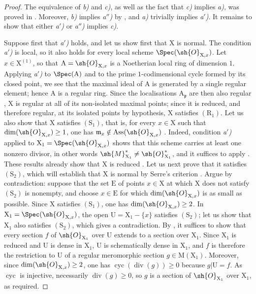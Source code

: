 \begin{proof}
The equivalence of \emph{b)} and \emph{c)}, as well as the fact that \emph{c)} implies \emph{a)}, was proved in .
Moreover, \emph{b)} implies \emph{a$''$)} by , and \emph{a)} trivially implies \emph{a$'$)}.
It remains to show that either \emph{a$'$)} or \emph{a$''$)} implies \emph{c)}.

Suppose first that \emph{a$'$)} holds, and let us show first that $\mathrm{X}$ is normal.
The condition \emph{a$'$)} is local, so it also holds for every local scheme $\Spec(\sh{O}_{\mathrm{X},x})$.
Let $x\in\mathrm{X}^{(1)}$, so that $\mathrm{A}=\sh{O}_{\mathrm{X},x}$ is a Noetherian local ring of dimension $1$.
Applying \emph{a$'$)} to $\Spec(\mathrm{A})$ and to the prime $1$-codimensional cycle formed by its closed point, we see that the maximal ideal of $\mathrm{A}$ is generated by a single regular element; hence  $\mathrm{A}$ is a regular ring.
Since the localisations $\mathrm{A}_{\mathfrak p}$ are then also regular , $\mathrm{X}$ is regular at all of its non-isolated maximal points; since it is reduced, and therefore regular, at its isolated points by hypothesis, $\mathrm{X}$ satisfies $(\mathrm{R}_1)$.
Let us also show that $\mathrm{X}$ satisfies $(\mathrm{S}_1)$, that is, for every $x\in\mathrm{X}$ such that $\dim(\sh{O}_{\mathrm{X},x})\geq 1$, one has $\mathfrak m_x\notin\operatorname{Ass}(\sh{O}_{\mathrm{X},x})$ .
Indeed, condition \emph{a$'$)} applied to $\mathrm{X}_1=\Spec(\sh{O}_{\mathrm{X},x})$ shows that this scheme carries at least one nonzero divisor, in other words $\sh{M}_{\mathrm{X}_1}^*\neq\sh{O}_{\mathrm{X}_1}^*$, and it suffices to apply .
These results already show that $\mathrm{X}$ is reduced .
Let us next prove that it satisfies $(\mathrm{S}_2)$, which will establish that $\mathrm{X}$ is normal by Serre's criterion .
Argue by contradiction: suppose that the set $\mathrm{E}$ of points $x\in\mathrm{X}$ at which $\mathrm{X}$ does not satisfy $(\mathrm{S}_2)$ is nonempty, and choose $x\in\mathrm{E}$ for which $\dim(\sh{O}_{\mathrm{X},x})$ is as small as possible.
Since $\mathrm{X}$ satisfies $(\mathrm{S}_1)$, one has $\dim(\sh{O}_{\mathrm{X},x})\geq 2$.
In $\mathrm{X}_1=\Spec(\sh{O}_{\mathrm{X},x})$, the open $\mathrm{U}=\mathrm{X}_1-\{x\}$ satisfies $(\mathrm{S}_2)$; let us show that $\mathrm{X}_1$ also satisfies $(\mathrm{S}_2)$, which gives a contradiction.
By , it suffices to show that every section $f$ of $\sh{O}_{\mathrm{X}_1}$ over $\mathrm{U}$ extends to a section over $\mathrm{X}_1$.
Since $\mathrm{X}_1$ is reduced and $\mathrm{U}$ is dense in $\mathrm{X}_1$, $\mathrm{U}$ is schematically dense in $\mathrm{X}_1$, and $f$ is therefore the restriction to $\mathrm{U}$ of a regular meromorphic section $g\in\mathrm{M}(\mathrm{X}_1)$.
Moreover, since $\dim(\sh{O}_{\mathrm{X},x})\geq 2$, one has $\operatorname{cyc}(\operatorname{div}(g))\geq 0$ because $g|\mathrm{U}=f$.
As $\operatorname{cyc}$ is injective, necessarily $\operatorname{div}(g)\geq 0$, so  $g$ is a section of $\sh{O}_{\mathrm{X}_1}$ over $\mathrm{X}_1$, as required.


\end{proof}
